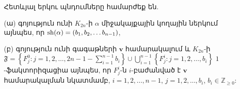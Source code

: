 \begin{lemma}\label{lEquiv}
Հետևյալ երկու պնդումները համարժեք են.
\begin{description}
\item{(ա)} գոյություն ունի $K_{2n}$-ի $\alpha$ միջակայքային կողային ներկում այնպես, որ ${\rm sh}(\alpha) = (b_1, b_2, \ldots b_{n-1})$,
\item{(բ)} գոյություն ունի գագաթների $\mathbf{v}$ համարակալում և $K_{2n}$-ի $\mathfrak{F} = 
\left\{ F^0_j : j=1,2,\ldots,2n-1-\sum\limits_{i=1}^{n-1}b_i \right\}
\cup
\bigcup\limits_{i=1}^{n-1}\left\{F^i_j : j=1,2,\ldots,b_i\right\}$ $1$-ֆակտորիզացիա այնպես, որ $F^i_j$-ն $i$-բաժանված է $\mathbf{v}$ համարակալման նկատմամբ, $i=1,2,\ldots,n-1$, $j=1,2,\ldots,b_i$, $b_i \in \mathbb{Z}_{\geq 0}$:
\end{description}
\end{lemma}

